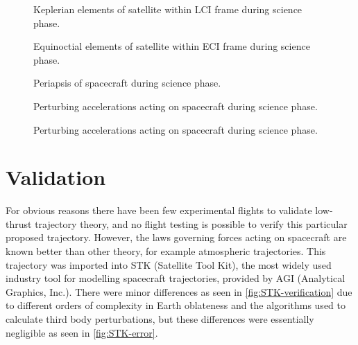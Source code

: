 \begin{figure}
\centering
\def\svgwidth{\figurewidth}

\caption{Keplerian elements of satellite within LCI frame during science phase.}
\label{fig:Science-kep-lci}
\end{figure}

\begin{figure}
\centering
\def\svgwidth{\figurewidth}

\caption{Equinoctial elements of satellite within ECI frame during science phase.}
\label{fig:Science-mee}
\end{figure}

\begin{figure}
\centering
\def\svgwidth{\figurewidth}

\caption{Periapsis of spacecraft during science phase.}
\label{fig:Science-peri}
\end{figure}

\begin{figure}
\centering
\def\svgwidth{\figurewidth}

\caption{Perturbing accelerations acting on spacecraft during science phase.}
\label{fig:Science-pert}
\end{figure}

\begin{figure}
\centering
\def\svgwidth{\figurewidth}

\caption{Perturbing accelerations acting on spacecraft during science phase.}
\label{fig:Science-pert2}
\end{figure}


\section{Validation} \label{sec:Validation}
For obvious reasons there have been few experimental flights to validate low-thrust trajectory theory, and no flight testing is possible to verify this particular proposed trajectory. However, the laws governing forces acting on spacecraft are known better than other theory, for example atmospheric trajectories. This trajectory was imported into STK (Satellite Tool Kit), the most widely used industry tool for modelling spacecraft trajectories, provided by AGI (Analytical Graphics, Inc.). There were minor differences as seen in \autoref{fig:STK-verification} due to different orders of complexity in Earth oblateness and the algorithms used to calculate third body perturbations, but these differences were essentially negligible as seen in \autoref{fig:STK-error}.

